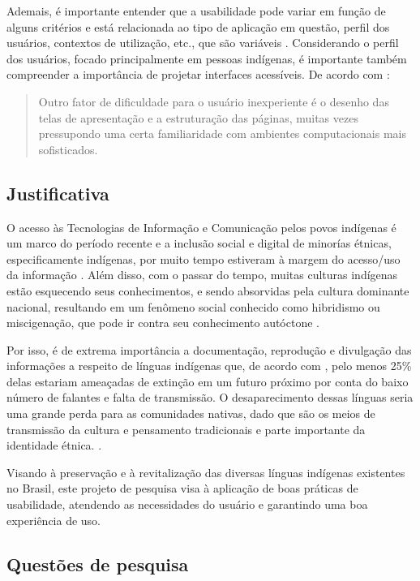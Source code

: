 Ademais, é importante entender que a usabilidade pode variar em função de alguns critérios e está relacionada ao tipo de aplicação em questão, perfil dos usuários,
contextos de utilização, etc., que são variáveis \cite{winckler2022}. Considerando o perfil dos usuários, focado principalmente em pessoas indígenas, é importante também
compreender a importância de projetar interfaces acessíveis. De acordo com \cite{takashi2000}:

\begin{quote}
    Outro fator de dificuldade para o usuário inexperiente é o desenho das telas de apresentação e a estruturação das páginas, muitas vezes pressupondo uma certa
    familiaridade com ambientes computacionais mais sofisticados.

\end{quote}

\subsection{Justificativa}

O acesso às Tecnologias de Informação e Comunicação pelos povos indígenas é um marco do período recente e a inclusão social e digital de minorías étnicas, especificamente
indígenas, por muito tempo estiveram à margem do acesso/uso da informação \cite{pinto2010}. Além disso, com o passar do tempo, muitas culturas indígenas estão esquecendo
seus conhecimentos, e sendo absorvidas pela cultura dominante nacional, resultando em um fenômeno social conhecido como hibridismo ou miscigenação, que pode ir contra seu
conhecimento autóctone \cite{pinto2010}.

Por isso, é de extrema importância a documentação, reprodução e divulgação das informações a respeito de línguas indígenas que, de acordo com \cite{moore2008}, pelo menos
25\% delas estariam ameaçadas de extinção em um futuro próximo por conta do baixo número de falantes e falta de transmissão. O desaparecimento dessas línguas seria uma
grande perda para as comunidades nativas, dado que são os meios de transmissão da cultura e pensamento tradicionais e parte importante da identidade étnica.
\cite{moore2008}.

Visando à preservação e à revitalização das diversas línguas indígenas existentes no Brasil, este projeto de pesquisa visa à aplicação de boas práticas de usabilidade,
atendendo as necessidades do usuário e garantindo uma boa experiência de uso.


\subsection{Questões de pesquisa}


